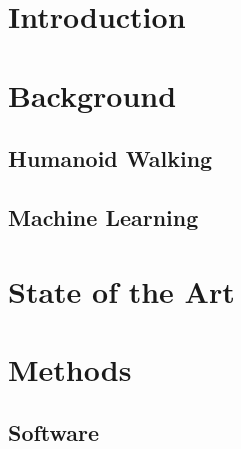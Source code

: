 \documentclass  [
  paper    = a4,
  BCOR     = 10mm,
  twoside,
  fontsize = 12pt,
  fleqn,
  toc      = bibnumbered,
  toc      = listofnumbered,
  numbers  = noendperiod,
  headings = normal,
  listof   = leveldown,
  version  = 3.03
]                                       {scrreprt}
\begin{document}
  

  \tableofcontents
  
  \chapter{Introduction}
    
  \chapter{Background}
  \section{Humanoid Walking}
  
  \section{Machine Learning}  
   
  \chapter{State of the Art}
   
  \chapter{Methods}
  \section{Software}
  
\end{document}

